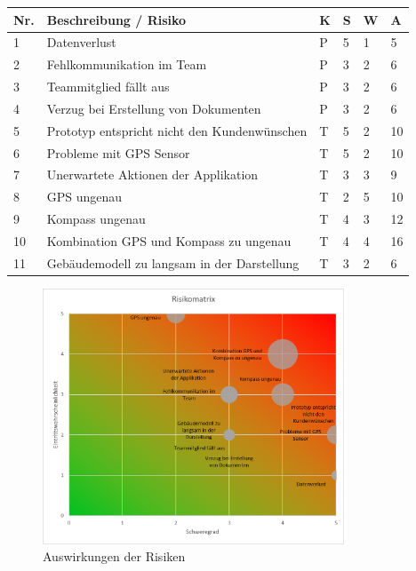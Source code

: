 \documentclass[a4paper]{scrreprt}
\begin{document}
\vspace{1em}
\noindent
\begin{tabular}{|p{}|p{}|p{}|p{}|p{}||p{}|}
	\hline
	\textbf{Nr.} & \textbf{Beschreibung / Risiko} & \textbf{K} & \textbf{S} & \textbf{W} & \textbf{A} \\
	\hline
	1 & Datenverlust & P & 5 & 1 & 5\\
	\hline
	2 & Fehlkommunikation im Team & P & 3 & 2 & 6 \\
	\hline
	3 & Teammitglied fällt aus & P & 3 & 2 & 6 \\
	\hline
	4 & Verzug bei Erstellung von Dokumenten & P & 3 & 2 & 6 \\
	\hline
	5 & Prototyp entspricht nicht den Kundenwünschen & T & 5 & 2 & 10 \\
	\hline
	6 & Probleme mit GPS Sensor & T & 5 & 2 & 10 \\
	\hline
	7 & Unerwartete Aktionen der Applikation & T & 3 & 3 & 9\\
	\hline
	8 & GPS ungenau & T & 2 & 5 & 10\\
	\hline
	9 & Kompass ungenau & T & 4 & 3 & 12\\
	\hline
	10 & Kombination GPS und Kompass zu ungenau & T & 4 & 4 & 16\\
	\hline
	11 & Gebäudemodell zu langsam in der Darstellung & T & 3 & 2 & 6\\
	\hline
\end{tabular}

\vspace{1em}

\begin{figure}[h!]
	\centering
	\includegraphics[keepaspectratio, width=0.8\textwidth]{RisikoMatrix}
	\caption{Auswirkungen der Risiken}
\end{figure}
\end{document}

